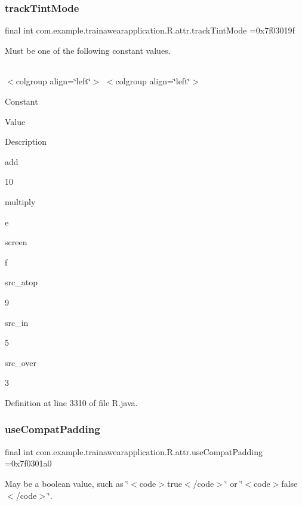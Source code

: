 \subsubsection{\texorpdfstring{trackTintMode}{trackTintMode}}
{\footnotesize\ttfamily final int com.\+example.\+trainawearapplication.\+R.\+attr.\+track\+Tint\+Mode =0x7f03019f\hspace{0.3cm}{\ttfamily [static]}}

Must be one of the following constant values.

\tabulinesep=1mm
\begin{longtabu}spread 0pt [c]{*{0}{|X[-1]}|}
\hline
\end{longtabu}
$<$colgroup align=\char`\"{}left\char`\"{}$>$ $<$colgroup align=\char`\"{}left\char`\"{}$>$ 

Constant

Value

Description 

add

10

multiply

e

screen

f

src\+\_\+atop

9

src\+\_\+in

5

src\+\_\+over

3

Definition at line 3310 of file R.\+java.

\mbox{\label{classcom_1_1example_1_1trainawearapplication_1_1_r_1_1attr_a056ce18344d74d416456d8116cce6088}} 
\subsubsection{\texorpdfstring{useCompatPadding}{useCompatPadding}}
{\footnotesize\ttfamily final int com.\+example.\+trainawearapplication.\+R.\+attr.\+use\+Compat\+Padding =0x7f0301a0\hspace{0.3cm}{\ttfamily [static]}}

May be a boolean value, such as \char`\"{}$<$code$>$true$<$/code$>$\char`\"{} or \char`\"{}$<$code$>$false$<$/code$>$\char`\"{}. 

